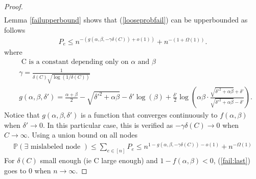 \documentclass[english]{article}
\newcommand{\1}{\textbf{1}}
\newcommand{\p}{\mathbb{P}}
\begin{document}
\begin{proof}
\begin{align}
\end{align}
Lemma \ref{failupperbound} shows that (\ref{looseprobfail}) can be upperbounded as follows
\begin{align}
P_e \leq n^{- (g(\alpha,\beta,- \gamma \delta(C) )+o(1))} + n^{-(1+\Omega(1))}.
\end{align}
where 
\begin{align}
&\text{ C is a constant depending only on $\alpha$ and $\beta$ } \\
 &\gamma= \frac{1}{\delta(C) \sqrt{\log(1/\delta(C))}}\\
 &g(\alpha, \beta, \delta')= \frac{\alpha+\beta}{2} - \sqrt{\delta'^2+\alpha \beta} -\delta' \log(\beta) +\frac{\delta'}{2} \log\left(\alpha \beta \cdot \frac{\sqrt{\delta'^2+\alpha \beta }+\delta'}{\sqrt{\delta'^2+\alpha \beta }-\delta'} \right).
\end{align}
Notice that $g(\alpha,\beta,\delta')$ is a function that converges continuously to $f(\alpha,\beta)$ when $\delta' \rightarrow 0$. In this particular case, this is verified as $-\gamma \delta(C) \rightarrow 0$ when $C \rightarrow \infty$. Using a union bound on all nodes
\begin{align}
\p(\exists \text{ mislabeled node }) \leq \sum_{e \in [n]} P_e \leq n^{1- g(\alpha,\beta, -\gamma \delta(C))-o(1)} +n^{-\Omega(1)} \label{fail:last}
\end{align}
For $\delta(C)$ small enough (ie C large enough) and $1-f(\alpha,\beta)<0$, (\ref{fail:last}) goes to 0 when $n \rightarrow \infty$.
\end{proof}



%

\end{document}
